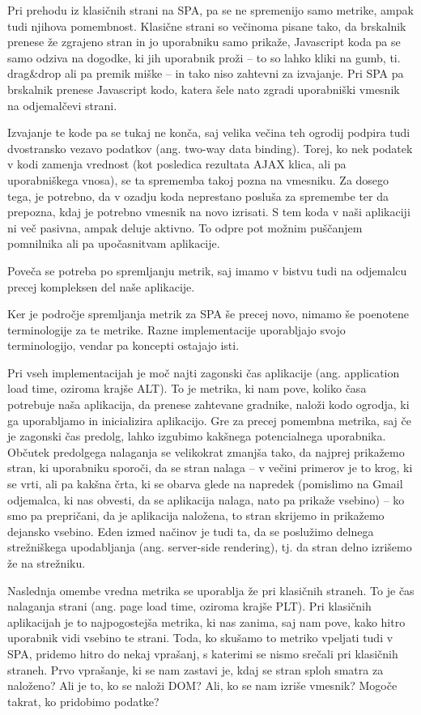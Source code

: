 \documentclass[a4paper, 12pt]{book}
\begin{document}
Pri prehodu iz klasičnih strani na SPA, pa se ne spremenijo samo metrike, ampak tudi njihova pomembnost. Klasične strani so večinoma pisane tako, da brskalnik prenese že zgrajeno stran in jo uporabniku samo prikaže, Javascript koda pa se samo odziva na dogodke, ki jih uporabnik proži – to so lahko kliki na gumb, ti. drag\&drop ali pa premik miške – in tako niso zahtevni za izvajanje. Pri SPA pa brskalnik prenese Javascript kodo, katera šele nato zgradi uporabniški vmesnik na odjemalčevi strani.

Izvajanje te kode pa se tukaj ne konča, saj velika večina teh ogrodij podpira tudi dvostransko vezavo podatkov (ang. two-way data binding). Torej, ko nek podatek v kodi zamenja vrednost (kot posledica rezultata AJAX klica, ali pa uporabniškega vnosa), se ta sprememba takoj pozna na vmesniku. Za dosego tega, je potrebno, da v ozadju koda neprestano posluša za spremembe ter da prepozna, kdaj je potrebno vmesnik na novo izrisati. S tem koda v naši aplikaciji ni več pasivna, ampak deluje aktivno. To odpre pot možnim puščanjem pomnilnika ali pa upočasnitvam aplikacije.

Poveča se potreba po spremljanju metrik, saj imamo v bistvu tudi na odjemalcu precej kompleksen del naše aplikacije.

Ker je področje spremljanja metrik za SPA še precej novo, nimamo še poenotene terminologije za te metrike. Razne implementacije \cite{linkedin_rum}\cite{mezzurite_website} uporabljajo svojo terminologijo, vendar pa koncepti ostajajo isti.

Pri vseh implementacijah je moč najti zagonski čas aplikacije (ang. application load time, oziroma krajše ALT). To je metrika, ki nam pove, koliko časa potrebuje naša aplikacija, da prenese zahtevane gradnike, naloži kodo ogrodja, ki ga uporabljamo in inicializira aplikacijo. Gre za precej pomembna metrika, saj če je zagonski čas predolg, lahko izgubimo kakšnega potencialnega uporabnika. Občutek predolgega nalaganja se velikokrat zmanjša tako, da najprej prikažemo stran, ki uporabniku sporoči, da se stran nalaga – v večini primerov je to krog, ki se vrti, ali pa kakšna črta, ki se obarva glede na napredek (pomislimo na Gmail odjemalca, ki nas obvesti, da se aplikacija nalaga, nato pa prikaže vsebino) – ko smo pa prepričani, da je aplikacija naložena, to stran skrijemo in prikažemo dejansko vsebino. Eden izmed načinov je tudi ta, da se poslužimo delnega strežniškega upodabljanja (ang. server-side rendering), tj. da stran delno izrišemo že na strežniku.

Naslednja omembe vredna metrika se uporablja že pri klasičnih straneh. To je čas nalaganja strani (ang. page load time, oziroma krajše PLT). Pri klasičnih aplikacijah je to najpogostejša metrika, ki nas zanima, saj nam pove, kako hitro uporabnik vidi vsebino te strani. Toda, ko skušamo to metriko vpeljati tudi v SPA, pridemo hitro do nekaj vprašanj, s katerimi se nismo srečali pri klasičnih straneh. Prvo vprašanje, ki se nam zastavi je, kdaj se stran sploh smatra za naloženo? Ali je to, ko se naloži DOM? Ali, ko se nam izriše vmesnik? Mogoče takrat, ko pridobimo podatke?
\end{document}
